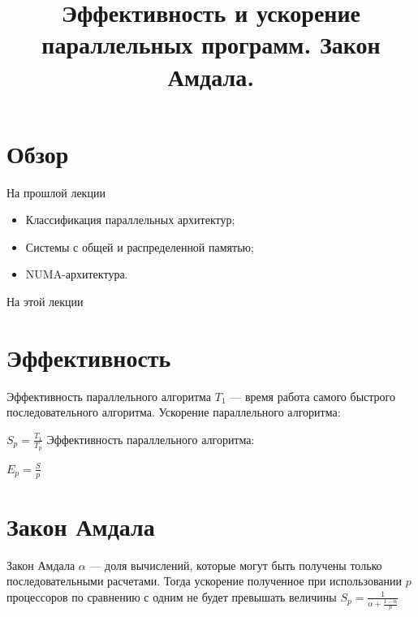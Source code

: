 

\title{Эффективность и ускорение параллельных программ. Закон Амдала.}



\begin{frame}
\titlepage
\end{frame}

\section*{Обзор}

\begin{frame}{На прошлой лекции}
\begin{itemize}
\ifsbertech
    \item Классификация параллельных архитектур;
    \item Системы с общей и распределенной памятью;
    \item NUMA-архитектура.
\fi
\end{itemize}
\end{frame}

\begin{frame}{На этой лекции}
\tableofcontents
\end{frame}

\section{Эффективность}

\begin{frame}{Эффективность параллельного алгоритма}
$T_1$ --- время работа самого быстрого последовательного алгоритма.
\vfill
Ускорение параллельного алгоритма:

$S_p = \frac{T_1}{T_p}$
\vfill
Эффективность параллельного алгоритма:

$E_p = \frac{S}{p}$
\end{frame}

\section{Закон Амдала}

\begin{frame}{Закон Амдала}
$\alpha$ --- доля вычислений, которые могут быть получены только
последовательными расчетами.
\vfill
Тогда ускорение полученное при использовании $p$ процессоров по сравнению с
одним не будет превышать величины
\vfill
$S_p =\frac{1}{\alpha + \frac{1 - \alpha}{p}}$
\end{frame}

